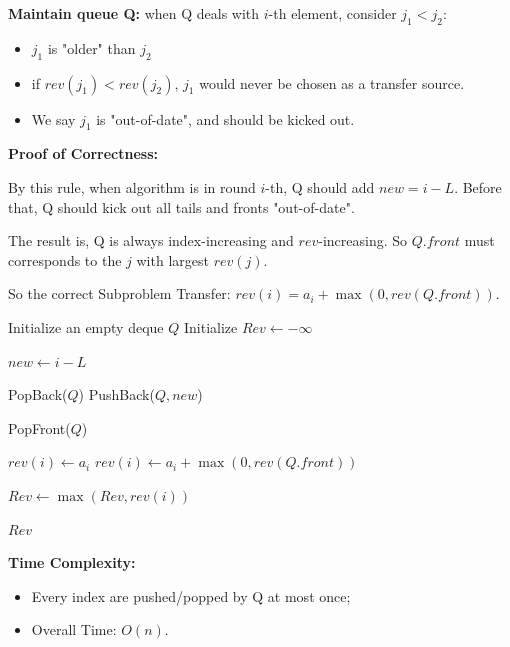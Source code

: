 \documentclass[11pt]{article}
\begin{document}
\textbf{Maintain queue Q:} when Q deals with $i$-th element, consider $j_1 < j_2 $: 

\begin{itemize}
    \item $j_1$ is "older" than $j_2$
    \item if $rev(j_1) < rev(j_2)$, $j_1$ would never be chosen as a transfer source. 
    \item We say $j_1$ is "out-of-date", and should be kicked out. 
\end{itemize}

\textbf{Proof of Correctness:}

\qquad By this rule, when algorithm is in round $i$-th, Q should add $new = i-L$. Before that, 
Q should kick out all tails and fronts "out-of-date". 

\qquad The result is, Q is always index-increasing and $rev$-increasing. So $Q.front$ must corresponds to the $j$
with largest $rev(j)$. 

\qquad So the correct Subproblem Transfer: $rev(i) = a_i + \max(0, rev(Q.front))$.
\newpage 
\begin{algorithm}
\caption{Find the maximum $(L,R)$-step subsequence with Potential Prefix}
\begin{algorithmic}[1]
\State Initialize an empty deque $Q$
\State Initialize $Rev \gets -\infty$

    \State $new \gets i - L$

            \State PopBack($Q$)
        \EndWhile
        \State PushBack($Q, new$)
    \EndIf

        \State PopFront($Q$)
    \EndWhile

        \State $rev(i) \gets a_i$
    \Else
        \State $rev(i) \gets a_i + \max(0, rev(Q.front))$
    \EndIf

    \State $Rev \gets \max(Rev, rev(i))$
\EndFor

\State \Return $Rev$
\end{algorithmic}
\end{algorithm}

\textbf{Time Complexity: } 
\begin{itemize}
    \item Every index are pushed/popped by Q at most once; 
    \item Overall Time: $O(n)$. 
\end{itemize}
\end{document}
